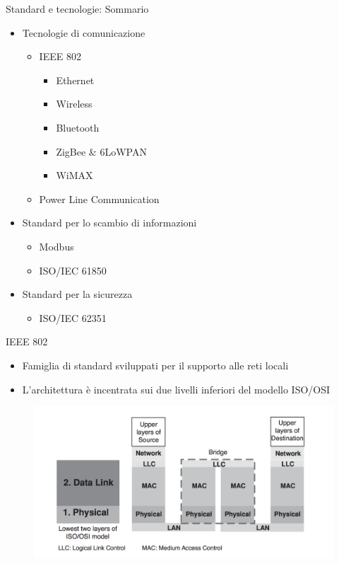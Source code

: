 \begin{frame}{Standard e tecnologie: Sommario}
	\begin{itemize}
		\item Tecnologie di comunicazione
		\begin{itemize}
			\item IEEE 802
			\begin{itemize}
				\item Ethernet
				\item Wireless
				\item Bluetooth
				\item ZigBee \& 6LoWPAN
				\item WiMAX
			\end{itemize}
			\item Power Line Communication
		\end{itemize}
		\item Standard per lo scambio di informazioni
		\begin{itemize}
			\item Modbus
			\item ISO/IEC 61850
		\end{itemize}
		\item Standard per la sicurezza
		\begin{itemize}
			\item ISO/IEC 62351
		\end{itemize}
	\end{itemize}
\end{frame}

\begin{frame}{IEEE 802}
	\begin{itemize}
		\item Famiglia di standard sviluppati per il supporto alle reti locali
		\item L'architettura è incentrata sui due livelli inferiori del modello ISO/OSI
	\end{itemize}
	\begin{figure}[h] 
		\includegraphics[scale=0.3,cfbox=blue_slides 1pt 0pt]{imgs/arch_ieee802.png}
	\end{figure}
\end{frame}

